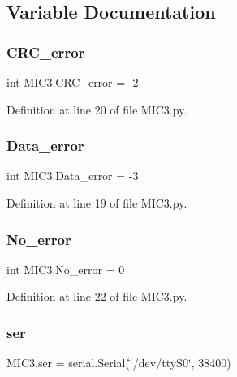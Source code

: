 \subsection{Variable Documentation}
\mbox{\label{namespace_m_i_c3_a1e02fce86341ebf194b77443e1617549}} 
\subsubsection{\texorpdfstring{C\+R\+C\+\_\+error}{CRC\_error}}
{\footnotesize\ttfamily int M\+I\+C3.\+C\+R\+C\+\_\+error = -\/2}



Definition at line 20 of file M\+I\+C3.\+py.

\mbox{\label{namespace_m_i_c3_a3e09291b9db0e529175f2c563a444764}} 
\subsubsection{\texorpdfstring{Data\+\_\+error}{Data\_error}}
{\footnotesize\ttfamily int M\+I\+C3.\+Data\+\_\+error = -\/3}



Definition at line 19 of file M\+I\+C3.\+py.

\mbox{\label{namespace_m_i_c3_a0ce9f24ca1c79bb3f000fbeef910ba5a}} 
\subsubsection{\texorpdfstring{No\+\_\+error}{No\_error}}
{\footnotesize\ttfamily int M\+I\+C3.\+No\+\_\+error = 0}



Definition at line 22 of file M\+I\+C3.\+py.

\mbox{\label{namespace_m_i_c3_a03a346fcfeb9c95caef3868437487b46}} 
\subsubsection{\texorpdfstring{ser}{ser}}
{\footnotesize\ttfamily M\+I\+C3.\+ser = serial.\+Serial(\char`\"{}/dev/tty\+S0\char`\"{}, 38400)}



